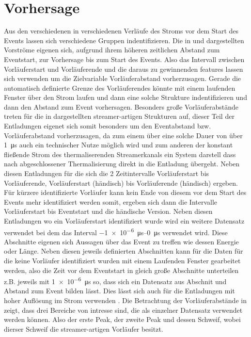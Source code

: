 \chapter{Vorhersage}
\label{chap:prediction}

Aus den verschiedenen in  verschiedenen Verläufe des Stroms vor dem Start des Events lassen sich verschiedene Gruppen indentifizieren. Die in  und  dargestellten Vorströme eigenen sich, aufgrund ihrem höheren zeitlichen Abstand zum Eventstart, zur Vorhersage bis zum Start des Events. Also das Intervall zwischen Vorläuferstart und Vorläuferende und die daraus zu gewinnenden features lassen sich verwenden um die Zielvariable Vorläuferabstand vorherzusagen. Gerade die automatisch definierte Grenze des Vorläuferendes könnte mit einem laufenden Fenster über den Strom laufen und dann eine solche Strukture indentifizieren und dann den Abstand zum Event vorhersagen. Besonders große Vorläuferabstände treten für die in  dargestellten streamer-artigen Strukturen auf, dieser Teil der Entladungen eigenet sich somit besonders um den Eventabstand bzw. Vorläuferabstand vorherzusagen, da zum einem über eine solche Dauer von über \SI{1}{\micro\second} auch ein technischer Nutze möglich wird und zum anderen der konstant fließende Strom des thermaliserenden Streamerkanals ein System darstell dass nach abgeschlossener Thermalisierung direkt in die Entladung übergeht. Neben diesen Entladungen für die sich die 2 Zeitintervalle Vorläuferstart bis Vorläuferende, Vorläuferstart (händisch) bis Vorläuferende (händisch) ergeben. Für kürzere identifizierte Vorläufer kann kein Ende von diesem vor dem Start des Events mehr identifiziert werden somit, ergeben sich dann die Intervalle Vorläuferstart bis Eventstart und die händische Version. Neben diesen Entladungen wo ein Vorläuferstart identifiziert wurde wird ein weitere Datensatz verwendet bei dem das Interval \SIrange{-1e-6}{0}{\micro\second} verwendet wird. Diese Abschnitte eigenen sich Aussagen über das Event zu treffen wie dessen Energie oder Länge. Neben diesen jeweils definierten Abschnitten kann für die Daten für die keine Vorläufer identifiziert wurden mit einem Laufenden Fenster gearbeitet werden, also die Zeit vor dem Eventstart in gleich große Abschnitte unterteilen z.B. jeweils mit \SI{1e-6}{\micro\second} so, dass sich ein Datensatz aus Abschnit und Abstand zum Event bilden lässt. Dies lässt sich auch für die Entladungen mit hoher Auflösung im Strom verwenden . Die Betrachtung der Vorläuferabstände in  zeigt, dass drei Bereiche von intresse sind, die als einzelner Datensatz verwendet werden können. Also der erste Peak, der zweite Peak und dessen Schweif, wobei dierser Schweif die streamer-artigen Vorläufer besitzt. 



